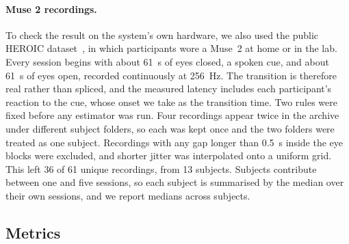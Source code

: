 \documentclass[11pt,a4paper]{article}
\begin{document}
\paragraph{Muse 2 recordings.} To check the result on the system's own hardware, we also
used the public HEROIC dataset~\cite{heroic}, in which participants wore a Muse~2 at home or
in the lab. Every session begins with about 61~s of eyes closed, a spoken cue, and about
61~s of eyes open, recorded continuously at 256~Hz. The transition is therefore real rather
than spliced, and the measured latency includes each participant's reaction to the cue,
whose onset we take as the transition time. Two rules were fixed before any estimator was
run. Four recordings appear twice in the archive under different subject folders, so each
was kept once and the two folders were treated as one subject. Recordings with any gap
longer than 0.5~s inside the eye blocks were excluded, and shorter jitter was interpolated
onto a uniform grid. This left 36 of 61 unique recordings, from 13 subjects. Subjects
contribute between one and five sessions, so each subject is summarised by the median over
their own sessions, and we report medians across subjects.

\subsection{Metrics}
\end{document}
